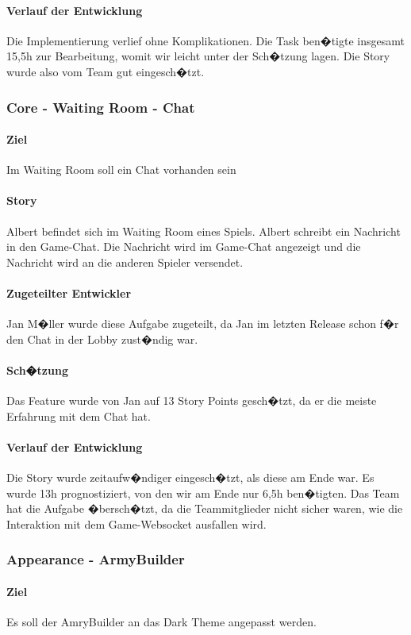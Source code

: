\documentclass[12pt, titlepage]{scrartcl}
\begin{document}
		\paragraph{Verlauf der Entwicklung} 
		Die Implementierung verlief ohne Komplikationen. Die Task ben�tigte insgesamt 15,5h zur Bearbeitung, womit wir leicht unter der Sch�tzung lagen. Die Story wurde also vom Team gut eingesch�tzt.
		
		\subsubsection{Core - Waiting Room - Chat}
		\paragraph{Ziel} Im Waiting Room soll ein Chat vorhanden sein
		\paragraph{Story} Albert befindet sich im Waiting Room eines Spiels. Albert schreibt ein Nachricht in den Game-Chat. Die Nachricht wird im Game-Chat angezeigt und die Nachricht wird an die anderen Spieler versendet.
		\paragraph{Zugeteilter Entwickler} Jan M�ller wurde diese Aufgabe zugeteilt, da Jan im letzten Release schon f�r den Chat in der Lobby zust�ndig war.
		\paragraph{Sch�tzung}
		Das Feature wurde von Jan auf 13 Story Points gesch�tzt, da er die meiste Erfahrung mit dem Chat hat.
		\paragraph{Verlauf der Entwicklung} 
		Die Story wurde zeitaufw�ndiger eingesch�tzt, als diese am Ende war. Es wurde 13h prognostiziert, von den wir am Ende nur 6,5h ben�tigten. Das Team hat die Aufgabe �bersch�tzt, da die Teammitglieder nicht sicher waren, wie die Interaktion mit dem Game-Websocket ausfallen wird.
		
		\subsubsection{Appearance - ArmyBuilder}
		\paragraph{Ziel} Es soll der AmryBuilder an das Dark Theme angepasst werden.
\end{document}
